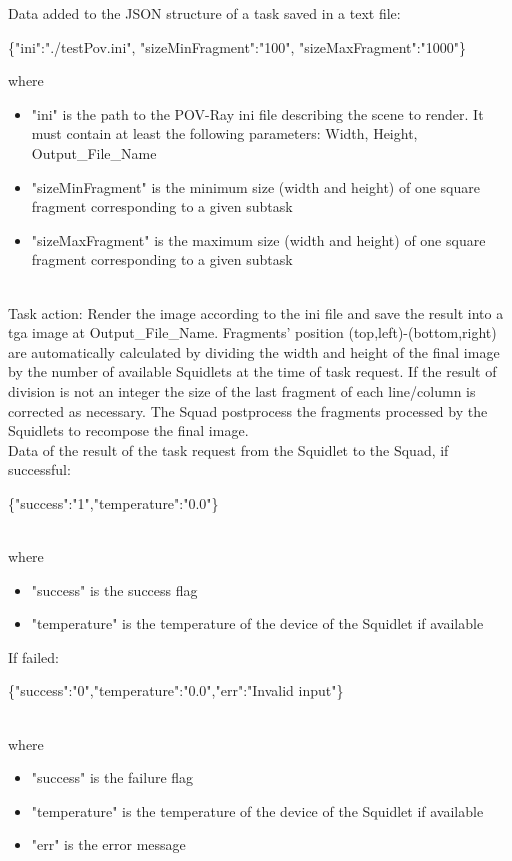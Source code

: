 Data added to the JSON structure of a task saved in a text file:\\
\begin{ttfamily}\{"ini":"./testPov.ini", "sizeMinFragment":"100", "sizeMaxFragment":"1000"\}\end{ttfamily}
where
\begin{itemize}
\item "ini" is the path to the POV-Ray ini file describing the scene to render. It must contain at least the following parameters: Width, Height, Output\_File\_Name
\item "sizeMinFragment" is the minimum size (width and height) of one square fragment corresponding to a given subtask
\item "sizeMaxFragment" is the maximum size (width and height) of one square fragment corresponding to a given subtask
\end{itemize}\\

Task action: Render the image according to the ini file and save the result into a tga image at Output\_File\_Name. Fragments' position (top,left)-(bottom,right) are automatically calculated by dividing the width and height of the final image by the number of available Squidlets at the time of task request. If the result of division is not an integer the size of the last fragment of each line/column is corrected as necessary. The Squad postprocess the fragments processed by the Squidlets to recompose the final image.\\

Data of the result of the task request from the Squidlet to the Squad, if successful:\\
\begin{ttfamily}\{"success":"1","temperature":"0.0"\}\end{ttfamily}\\
where
\begin{itemize}
\item "success" is the success flag
\item "temperature" is the temperature of the device of the Squidlet if available
\end{itemize}
If failed:\\
\begin{ttfamily}\{"success":"0","temperature":"0.0","err":"Invalid input"\}\end{ttfamily}\\
where
\begin{itemize}
\item "success" is the failure flag
\item "temperature" is the temperature of the device of the Squidlet if available
\item "err" is the error message
\end{itemize}

